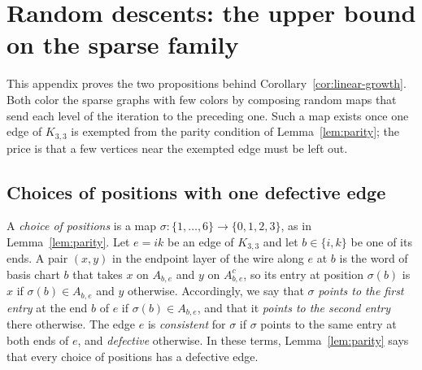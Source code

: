 \section{Random descents: the upper bound on the sparse family}\label{app:readings}

This appendix proves the two propositions behind Corollary~\ref{cor:linear-growth}. Both color the sparse graphs with few colors by composing random maps that send each level of the iteration to the preceding one. Such a map exists once one edge of $K_{3,3}$ is exempted from the parity condition of Lemma~\ref{lem:parity}; the price is that a few vertices near the exempted edge must be left out.

\subsection{Choices of positions with one defective edge}\label{app:defect}

A \emph{choice of positions} is a map $\sigma:\{1,\ldots,6\}\to\{0,1,2,3\}$, as in Lemma~\ref{lem:parity}. Let $e=ik$ be an edge of $K_{3,3}$ and let $b\in\{i,k\}$ be one of its ends. A pair $(x,y)$ in the endpoint layer of the wire along $e$ at $b$ is the word of basis chart $b$ that takes $x$ on $A_{b,e}$ and $y$ on $A_{b,e}^c$, so its entry at position $\sigma(b)$ is $x$ if $\sigma(b)\in A_{b,e}$ and $y$ otherwise. Accordingly, we say that $\sigma$ \emph{points to the first entry} at the end $b$ of $e$ if $\sigma(b)\in A_{b,e}$, and that it \emph{points to the second entry} there otherwise. The edge $e$ is \emph{consistent} for $\sigma$ if $\sigma$ points to the same entry at both ends of $e$, and \emph{defective} otherwise. In these terms, Lemma~\ref{lem:parity} says that every choice of positions has a defective edge.

